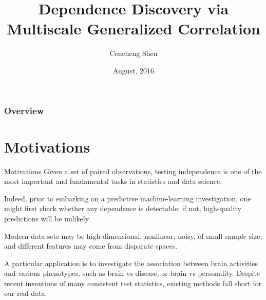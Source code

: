 \documentclass{beamer}
\title[JSM2016]{Dependence Discovery via Multiscale Generalized Correlation}
\author{Cencheng Shen} %
\institute[] %
{
\textit{Joint Work with Joshua T. Vogelstein \& Mauro Maggioni \& Carey E. Priebe} \\
}
\date{August, 2016} %
\begin{document}

\begin{frame}
\titlepage %
\end{frame}

\begin{frame}
\frametitle{Overview} %
\tableofcontents %
\end{frame}

\section{Motivations}
\begin{frame}{Motivations}
Given a set of paired observations, testing independence is one of the most important and fundamental tasks in statistics and data science.

\pause
\medskip
Indeed, prior to embarking on a predictive machine-learning investigation, one might first check whether any dependence is detectable; if not, high-quality predictions will be unlikely.

\pause
\medskip
Modern data sets may be high-dimensional, nonlinear, noisy, of small sample size; and different features may come from disparate spaces.

\pause
\medskip
A particular application is to investigate the association between brain activities and various phenotypes, such as brain vs disease, or brain vs personality. Despite recent inventions of many consistent test statistics, existing methods fall short for our real data. 
\end{frame}
\end{document}
